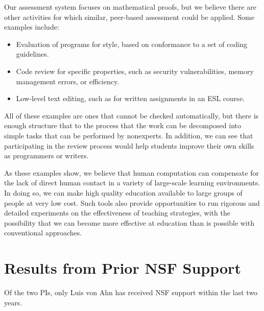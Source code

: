 \documentclass[12pt]{article}
\begin{document}
Our assessment system focuses on mathematical proofs, but we believe
there are other activities for which similar, peer-based assessment
could be applied.  Some examples include:
\begin{itemize}
\item
Evaluation of programs for style, based on conformance to a set of
coding guidelines.

\item
Code review for specific properties, such as security vulnerabilities,
memory management errors, or efficiency.

\item
Low-level text editing, such as for written assignments in an ESL course.
\end{itemize}

All of these examples are ones that cannot be checked automatically,
but there is enough structure that to the process that the work can be
decomposed into simple tasks that can be performed by nonexperts.  In
addition, we can see that participating in the review process would
help students improve their own skills as programmers or writers.

As these examples show, we believe that human computation can
compensate for the lack of direct human contact in a variety of
large-scale learning environments.  In doing so, we can make high
quality education available to large groups of people at very low
cost.  Such tools also provide opportunities to run rigorous and
detailed experiments on the effectiveness of teaching strategies, with
the possibility that we can become more effective at education than is
possible with conventional approaches.

\section{Results from Prior NSF Support}

Of the two PIs, only Luis von Ahn has received NSF support within the
last two years.


\newpage


\end{document}
